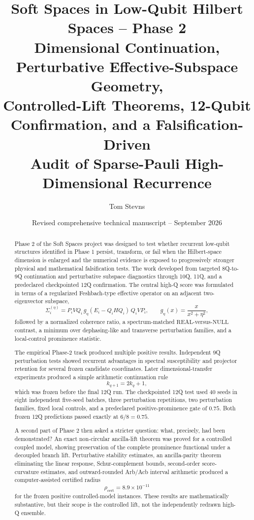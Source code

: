 \documentclass[11pt,a4paper]{article}
\title{
\textbf{Soft Spaces in Low-Qubit Hilbert Spaces -- Phase 2}\\[0.4em]
\large Dimensional Continuation, Perturbative Effective-Subspace Geometry,\\
Controlled-Lift Theorems, 12-Qubit Confirmation, and a Falsification-Driven\\
Audit of Sparse-Pauli High-Dimensional Recurrence
}
\author[1]{Tom Stevns}
\affil[1]{Independent Researcher}
\date{Revised comprehensive technical manuscript -- September 2026}
\newcommand{\Real}{\mathrm{REAL}}
\newcommand{\Null}{\mathrm{NULL}}
\begin{document}
\maketitle

\begin{abstract}
Phase 2 of the Soft Spaces project was designed to test whether recurrent
low-qubit structures identified in Phase 1 persist, transform, or fail when
the Hilbert-space dimension is enlarged and the numerical evidence is exposed
to progressively stronger physical and mathematical falsification tests.
The work developed from targeted 8Q-to-9Q continuation and perturbative
subspace diagnostics through 10Q, 11Q, and a predeclared checkpointed 12Q
confirmation.  The central high-Q score was formulated in terms of a
regularized Feshbach-type effective operator on an adjacent two-eigenvector
subspace,
\[
\Sigma_i^{(\eta)}
=
P_i VQ_i\,g_\eta(E_i-Q_iHQ_i)\,Q_iVP_i,
\qquad
g_\eta(x)=\frac{x}{x^2+\eta^2},
\]
followed by a normalized coherence ratio, a spectrum-matched
\(\Real\)-versus-\(\Null\) contrast, a minimum over dephasing-like and
transverse perturbation families, and a local-control prominence statistic.

The empirical Phase-2 track produced multiple positive results.  Independent
9Q perturbation tests showed recurrent advantages in spectral susceptibility
and projector retention for several frozen candidate coordinates.  Later
dimensional-transfer experiments produced a simple arithmetic continuation
rule
\[
k_{q+1}=2k_q+1,
\]
which was frozen before the final 12Q run.  The checkpointed 12Q test used
40 seeds in eight independent five-seed batches, three perturbation
repetitions, two perturbation families, fixed local controls, and a
predeclared positive-prominence gate of \(0.75\).  Both frozen 12Q predictions
passed exactly at \(6/8=0.75\).

A second part of Phase 2 then asked a stricter question: what, precisely, had
been demonstrated?  An exact non-circular ancilla-lift theorem was proved for
a controlled coupled model, showing preservation of the complete prominence
functional under a decoupled branch lift.  Perturbative stability estimates,
an ancilla-parity theorem eliminating the linear response, Schur-complement
bounds, second-order score-curvature estimates, and outward-rounded Arb/Acb
interval arithmetic produced a computer-assisted certified radius
\[
\rho_{\mathrm{cert}}=8.9\times 10^{-11}
\]
for the frozen positive controlled-model instances.  These results are
mathematically substantive, but their scope is the controlled lift, not the
independently redrawn high-Q ensemble.


\end{abstract}
\end{document}
